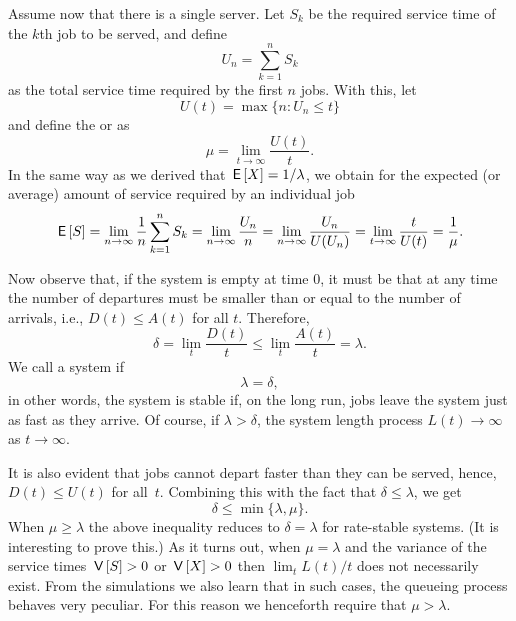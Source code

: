 Assume now that there is a single server. Let $S_k$ be the required
service time of the $k$th job to be served, and define
\begin{equation*}
U_n = \sum_{k=1}^n S_k
\end{equation*}
as the total service time required by the first $n$ jobs. With this,
let 
\begin{equation*}
  U(t) = \max\{n: U_n \leq t\}
\end{equation*}
and  define the  or  as
\begin{equation*}
  \mu = \lim_{t\to\infty} \frac{U(t)}t.
\end{equation*}
In the same way as we derived that $\,\mathsf{E}\left[X\right]= 1/\lambda$, we obtain for
the expected (or average) amount of service required by an individual
job
\begin{equation*}
  \,\mathsf{E}\left[S\right] = \lim_{n\to\infty} \frac 1 n \sum_{k=1}^n S_k = \lim_{n\to\infty} \frac{U_n}{n} = \lim_{n\to\infty} \frac{U_n}{U(U_n)} = \lim_{t\to\infty} \frac t{U(t)} = \frac 1 \mu.
\end{equation*}

Now observe that, if the system is empty at time $0$, it must be that
at any time the number of departures must be smaller than or equal to the number
of arrivals, i.e., $D(t) \leq A(t)$ for all $t$. Therefore,
\begin{equation}\label{eq:26}
\delta =   \lim_t \frac{D(t)}t \leq \lim_t \frac{A(t)}t = \lambda.
\end{equation}
We call a system  if
\begin{equation*}
  \lambda = \delta,
\end{equation*}
in other words, the system is stable if, on the long run, jobs leave
the system just as fast as they arrive. Of course, if
$\lambda > \delta$, the system length process $L(t) \to \infty$ as
$t\to \infty$.

It is also evident that jobs cannot depart faster than they can be
served, hence, $D(t) \leq U(t)$ for all~$t$. Combining this with the
fact that $\delta \leq \lambda$, we get
\begin{equation*}
  \delta \leq \min\{\lambda, \mu\}.
\end{equation*}
When $\mu \geq \lambda$ the above inequality reduces to
$\delta = \lambda$ for rate-stable systems. (It is interesting to
prove this.) As it turns out, when $\mu = \lambda$ and the variance of
the service times $\,\mathsf{V}\left[S\right] > 0$ or $\,\mathsf{V}\left[X\right] >0$ then $\lim_t L(t)/t$
does not necessarily exist. From the simulations we also learn that in such cases, the queueing process behaves very peculiar. For this reason we henceforth require that $\mu > \lambda$.



